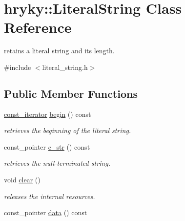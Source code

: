 \hypertarget{classhryky_1_1_literal_string}{\section{hryky\-:\-:Literal\-String Class Reference}
\label{classhryky_1_1_literal_string}
}


retains a literal string and its length.  




{\ttfamily \#include $<$literal\-\_\-string.\-h$>$}

\subsection*{Public Member Functions}
\begin{DoxyCompactItemize}
\item 
\hypertarget{classhryky_1_1_literal_string_a29b83ae318bb5cb3551ac6e35bdedd04}{\hyperlink{classhryky_1_1iterator_1_1random_1_1_immutable}{const\-\_\-iterator} \hyperlink{classhryky_1_1_literal_string_a29b83ae318bb5cb3551ac6e35bdedd04}{begin} () const }\label{classhryky_1_1_literal_string_a29b83ae318bb5cb3551ac6e35bdedd04}

\begin{DoxyCompactList}\small\item\em retrieves the beginning of the literal string. \end{DoxyCompactList}\item 
\hypertarget{classhryky_1_1_literal_string_af5e08a81b6cff4ccbc3f0fe190aa6a14}{const\-\_\-pointer \hyperlink{classhryky_1_1_literal_string_af5e08a81b6cff4ccbc3f0fe190aa6a14}{c\-\_\-str} () const }\label{classhryky_1_1_literal_string_af5e08a81b6cff4ccbc3f0fe190aa6a14}

\begin{DoxyCompactList}\small\item\em retrieves the null-\/terminated string. \end{DoxyCompactList}\item 
\hypertarget{classhryky_1_1_literal_string_a9e30d71c2a4759b1da6f8775173a7b17}{void \hyperlink{classhryky_1_1_literal_string_a9e30d71c2a4759b1da6f8775173a7b17}{clear} ()}\label{classhryky_1_1_literal_string_a9e30d71c2a4759b1da6f8775173a7b17}

\begin{DoxyCompactList}\small\item\em releases the internal resources. \end{DoxyCompactList}\item 
\hypertarget{classhryky_1_1_literal_string_a2d7989565e68cd94432f7763fb99b525}{const\-\_\-pointer \hyperlink{classhryky_1_1_literal_string_a2d7989565e68cd94432f7763fb99b525}{data} () const }\label{classhryky_1_1_literal_string_a2d7989565e68cd94432f7763fb99b525}


\end{DoxyCompactItemize}
